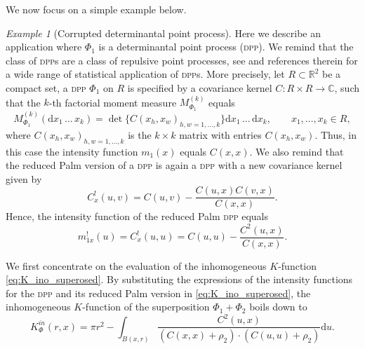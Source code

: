 \documentclass[11pt,a4paper,oneside]{article}
\newcommand{\dd}{\mathrm d}
\theoremstyle{definition}
\theoremstyle{remark}
\newtheorem{example}{Example}
\begin{document}
We now focus on a simple example below. 
\begin{example}[Corrupted determinantal point process]
Here we describe an application where $\Phi_1$ is a determinantal point process (\textsc{dpp}). We remind that the class of \textsc{dpp}s  are a class of repulsive point processes, see \citet{Lavancier2015,KuleszaTaskar2012} and references therein for a wide range of statistical application of \textsc{dpp}s. More precisely, let $R \subset \mathbb R^2$ be a compact set, a \textsc{dpp} $\Phi_1$ on $R$ is specified by a covariance kernel $C: R \times R \rightarrow \mathbb C$, such that the $k$-th factorial moment measure $M_{\Phi_1}^{(k)}$ equals
\[
    M_{\Phi_1}^{(k)}(\dd x_1\, \ldots\, x_k) = \det\{C(x_h, x_w)_{h,w = 1,\ldots,k}\} \dd x_1\,\ldots\, \dd x_k, \qquad x_1, \ldots, x_k \in R,
\]
where $C(x_h, x_w)_{h,w = 1,\ldots,k}$ is the $k \times k$ matrix with entries $C(x_h, x_w)$. Thus, in this case the intensity function $m_1 (x)$ equals $C (x,x)$.
We also remind that the reduced Palm version of a \textsc{dpp} is again a \textsc{dpp} with a new covariance kernel given by
\[
C^{!}_x (u, v) = C (u, v) - \frac{C (u, x) C(v, x)}{C (x,x)}.
\]
Hence,  the intensity function of the reduced Palm \textsc{dpp} equals
\[
m_{1x}^! (u) =  C^{!}_x (u, u) = C (u, u) - \frac{C^2 (u, x)}{C (x,x)} . 
\]

We first concentrate on the evaluation of the inhomogeneous $K$-function \eqref{eq:K_ino_superosed}.
By substituting the expressions of the intensity functions for the \textsc{dpp} and its reduced Palm version  in  \eqref{eq:K_ino_superosed}, the inhomogeneous $K$-function of the superposition $\Phi_1+\Phi_2$ boils down to
\begin{equation*}
     K_{\Phi}^{in} (r,x)  = \pi r^2  - \int_{B (x,r)} \frac{C^2 (u,x)}{(C(x,x)+ \rho_2) \cdot(C(u,u)+ \rho_2)} \dd u .
\end{equation*}


\end{example}
\end{document}
